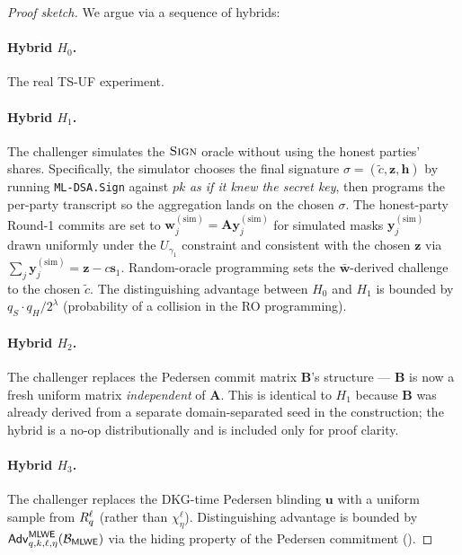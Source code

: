 \begin{proof}[Proof sketch]
We argue via a sequence of hybrids:

\paragraph{Hybrid $H_0$.} The real TS-UF experiment.

\paragraph{Hybrid $H_1$.} The challenger simulates the $\textsc{Sign}$ oracle
without using the honest parties' shares. Specifically, the
simulator chooses the final signature $\sigma = (\tilde c, \mathbf{z},
\mathbf{h})$ by running \texttt{ML-DSA.Sign} against $\mathit{pk}$
\emph{as if it knew the secret key}, then programs the per-party
transcript so the aggregation lands on the chosen $\sigma$. The
honest-party Round-1 commits are set to $\mathbf{w}_j^{(\mathrm{sim})} =
\mathbf{A}\mathbf{y}_j^{(\mathrm{sim})}$ for simulated masks $\mathbf{y}_j^{(\mathrm{sim})}$
drawn uniformly under the $U_{\gamma_1}$ constraint and consistent with
the chosen $\mathbf{z}$ via
$\sum_j \mathbf{y}_j^{(\mathrm{sim})} = \mathbf{z} - c\mathbf{s}_1$.
Random-oracle programming sets the $\bar{\mathbf{w}}$-derived challenge to
the chosen $\tilde c$. The distinguishing advantage between $H_0$
and $H_1$ is bounded by $q_S \cdot q_H / 2^\lambda$ (probability of a
collision in the RO programming).

\paragraph{Hybrid $H_2$.} The challenger replaces the Pedersen commit
matrix $\mathbf{B}$'s structure --- $\mathbf{B}$ is now a fresh
uniform matrix \emph{independent} of $\mathbf{A}$. This is identical
to $H_1$ because $\mathbf{B}$ was already derived from a separate
domain-separated seed in the construction; the hybrid is a no-op
distributionally and is included only for proof clarity.

\paragraph{Hybrid $H_3$.} The challenger replaces the DKG-time
Pedersen blinding $\mathbf{u}$ with a uniform sample from $R_q^\ell$
(rather than $\chi_\eta^\ell$). Distinguishing advantage is bounded
by $\mathsf{Adv}^{\mathsf{MLWE}}_{q, k, \ell, \eta}(\mathcal{B}_{\mathsf{MLWE}})$ via the
hiding property of the Pedersen commitment
().


\end{proof}

